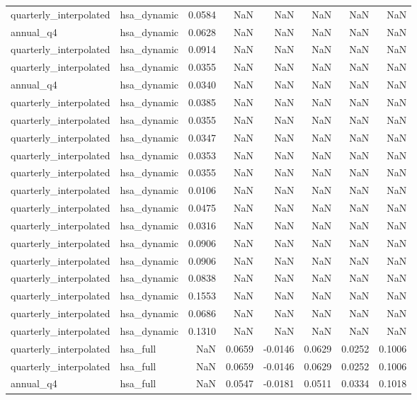 \begin{tabular}{llrrrrrr}
quarterly\_interpolated & hsa\_dynamic & 0.0584 & NaN & NaN & NaN & NaN & NaN \\
annual\_q4 & hsa\_dynamic & 0.0628 & NaN & NaN & NaN & NaN & NaN \\
quarterly\_interpolated & hsa\_dynamic & 0.0914 & NaN & NaN & NaN & NaN & NaN \\
quarterly\_interpolated & hsa\_dynamic & 0.0355 & NaN & NaN & NaN & NaN & NaN \\
annual\_q4 & hsa\_dynamic & 0.0340 & NaN & NaN & NaN & NaN & NaN \\
quarterly\_interpolated & hsa\_dynamic & 0.0385 & NaN & NaN & NaN & NaN & NaN \\
quarterly\_interpolated & hsa\_dynamic & 0.0355 & NaN & NaN & NaN & NaN & NaN \\
quarterly\_interpolated & hsa\_dynamic & 0.0347 & NaN & NaN & NaN & NaN & NaN \\
quarterly\_interpolated & hsa\_dynamic & 0.0353 & NaN & NaN & NaN & NaN & NaN \\
quarterly\_interpolated & hsa\_dynamic & 0.0355 & NaN & NaN & NaN & NaN & NaN \\
quarterly\_interpolated & hsa\_dynamic & 0.0106 & NaN & NaN & NaN & NaN & NaN \\
quarterly\_interpolated & hsa\_dynamic & 0.0475 & NaN & NaN & NaN & NaN & NaN \\
quarterly\_interpolated & hsa\_dynamic & 0.0316 & NaN & NaN & NaN & NaN & NaN \\
quarterly\_interpolated & hsa\_dynamic & 0.0906 & NaN & NaN & NaN & NaN & NaN \\
quarterly\_interpolated & hsa\_dynamic & 0.0906 & NaN & NaN & NaN & NaN & NaN \\
quarterly\_interpolated & hsa\_dynamic & 0.0838 & NaN & NaN & NaN & NaN & NaN \\
quarterly\_interpolated & hsa\_dynamic & 0.1553 & NaN & NaN & NaN & NaN & NaN \\
quarterly\_interpolated & hsa\_dynamic & 0.0686 & NaN & NaN & NaN & NaN & NaN \\
quarterly\_interpolated & hsa\_dynamic & 0.1310 & NaN & NaN & NaN & NaN & NaN \\
quarterly\_interpolated & hsa\_full & NaN & 0.0659 & -0.0146 & 0.0629 & 0.0252 & 0.1006 \\
quarterly\_interpolated & hsa\_full & NaN & 0.0659 & -0.0146 & 0.0629 & 0.0252 & 0.1006 \\
annual\_q4 & hsa\_full & NaN & 0.0547 & -0.0181 & 0.0511 & 0.0334 & 0.1018 \\

\end{tabular}
